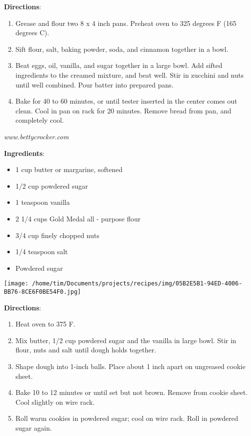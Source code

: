 \documentclass[11pt, twoside, openany]{book}
\begin{document}
\textbf{Directions}:
\vspace{-3mm}\begin{enumerate}\setlength\itemsep{-1mm}
\item Grease and flour two 8 x 4 inch pans. Preheat oven to 325 degrees F (165 degrees C).
\item Sift flour, salt, baking powder, soda, and cinnamon together in a bowl.
\item Beat eggs, oil, vanilla, and sugar together in a large bowl. Add sifted ingredients to the creamed mixture, and beat well. Stir in zucchini and nuts until well combined. Pour batter into prepared pans.
\item Bake for 40 to 60 minutes, or until tester inserted in the center comes out clean. Cool in pan on rack for 20 minutes. Remove bread from pan, and completely cool.
\end{enumerate}
 \label{russian-tea-cakes}\hfill\textit{www.bettycrocker.com}\\
\begin{minipage}[t]{0.8\linewidth}
\textbf{Ingredients}:\vspace{-3mm}
\begin{multicols}{2}
\begin{itemize}\setlength\itemsep{-1mm}
\item 1 cup butter or margarine, softened
\item 1/2 cup powdered sugar
\item 1 teaspoon vanilla
\item 2 1/4 cups Gold Medal all - purpose flour
\item 3/4 cup finely chopped nuts
\item 1/4 teaspoon salt
\item Powdered sugar
\end{itemize}
\end{multicols}
\end{minipage}
\begin{minipage}[t]{0.2\linewidth}
\centering \strut\vspace*{-\baselineskip}\newline
\texttt{[image: /home/tim/Documents/projects/recipes/img/05B2E5B1-94ED-4006-BB76-8CE6F0BE54F0.jpg]}\\
\end{minipage}\vspace{3mm}
\textbf{Directions}:
\vspace{-3mm}\begin{enumerate}\setlength\itemsep{-1mm}
\item Heat oven to 375 F.
\item Mix butter, 1/2 cup powdered sugar and the vanilla in large bowl. Stir in flour, nuts and salt until dough holds together.
\item Shape dough into 1-inch balls. Place about 1 inch apart on ungreased cookie sheet.
\item Bake 10 to 12 minutes or until set but not brown. Remove from cookie sheet. Cool slightly on wire rack.
\item Roll warm cookies in powdered sugar; cool on wire rack. Roll in powdered sugar again.
\end{enumerate}
\end{document}
